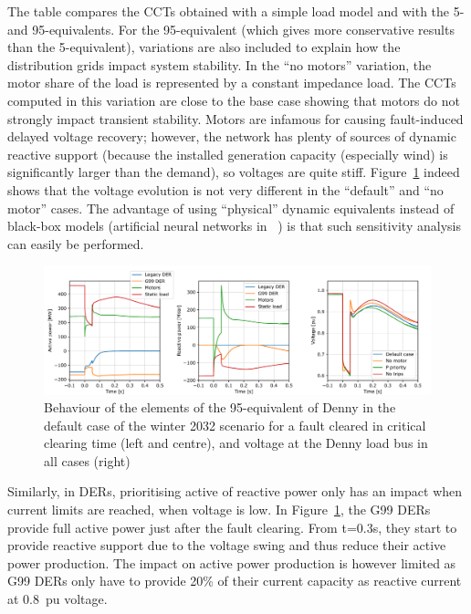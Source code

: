 The table compares the CCTs obtained with a simple load model and with the 5- and 95-equivalents. For the 95-equivalent (which gives more conservative results than the 5-equivalent), variations are also included to explain how the distribution grids impact system stability. In the ``no motors'' variation, the motor share of the load is represented by a constant impedance load. The CCTs computed in this variation are close to the base case showing that motors do not strongly impact transient stability. Motors are infamous for causing fault-induced delayed voltage recovery; however, the network has plenty of sources of dynamic reactive support (because the installed generation capacity (especially wind) is significantly larger than the demand), so voltages are quite stiff. Figure~\ref{fig:CIGRE_sensitivities} indeed shows that the voltage evolution is not very different in the ``default'' and ``no motor'' cases. The advantage of using ``physical'' dynamic equivalents instead of black-box models (\eg artificial neural networks in ~\cite{Vorwerk}) is that such sensitivity analysis can easily be performed.

\begin{figure}
    \centering
    \includegraphics[width=\linewidth]{Figs/CIGRE_sensitivities.pdf}
    \caption{Behaviour of the elements of the 95-equivalent of Denny in the default case of the winter 2032 scenario for a fault cleared in critical clearing time (left and centre), and voltage at the Denny load bus in all cases (right)}
    \label{fig:CIGRE_sensitivities}
\end{figure}

Similarly, in DERs, prioritising active of reactive power only has an impact when current limits are reached, \ie when voltage is low. In Figure~\ref{fig:CIGRE_sensitivities}, the G99 DERs provide full active power just after the fault clearing. From t=0.3s, they start to provide reactive support due to the voltage swing and thus reduce their active power production. The impact on active power production is however limited as G99 DERs only have to provide 20\% of their current capacity as reactive current at 0.8~pu voltage.

